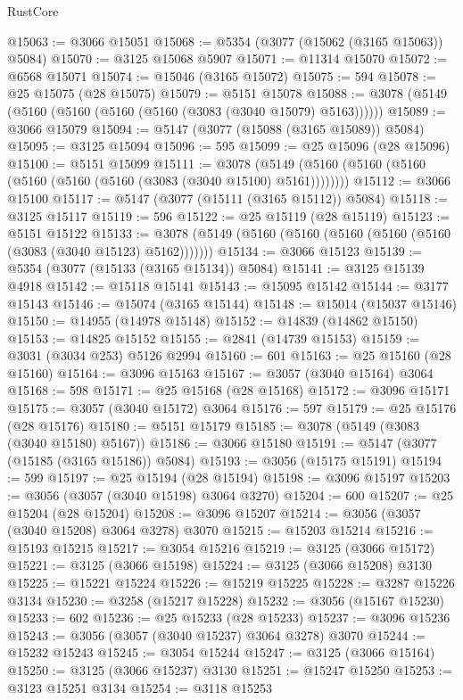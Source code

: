\begin{lexlean}{RustCore}
\begin{coremodule}
@15063 := @3066 @15051
@15068 := @5354 (@3077 (@15062 (@3165 @15063)) @5084)
@15070 := @3125 @15068 @5907
@15071 := @11314 @15070
@15072 := @6568 @15071
@15074 := @15046 (@3165 @15072)
@15075 := 594
@15078 := @25 @15075 (@28 @15075)
@15079 := @5151 @15078
@15088 := @3078 (@5149 (@5160 (@5160 (@5160 (@5160 (@3083 (@3040 @15079) @5163))))))
@15089 := @3066 @15079
@15094 := @5147 (@3077 (@15088 (@3165 @15089)) @5084)
@15095 := @3125 @15094
@15096 := 595
@15099 := @25 @15096 (@28 @15096)
@15100 := @5151 @15099
@15111 := @3078 (@5149 (@5160 (@5160 (@5160 (@5160 (@5160 (@5160 (@3083 (@3040 @15100) @5161))))))))
@15112 := @3066 @15100
@15117 := @5147 (@3077 (@15111 (@3165 @15112)) @5084)
@15118 := @3125 @15117
@15119 := 596
@15122 := @25 @15119 (@28 @15119)
@15123 := @5151 @15122
@15133 := @3078 (@5149 (@5160 (@5160 (@5160 (@5160 (@5160 (@3083 (@3040 @15123) @5162)))))))
@15134 := @3066 @15123
@15139 := @5354 (@3077 (@15133 (@3165 @15134)) @5084)
@15141 := @3125 @15139 @4918
@15142 := @15118 @15141
@15143 := @15095 @15142
@15144 := @3177 @15143
@15146 := @15074 (@3165 @15144)
@15148 := @15014 (@15037 @15146)
@15150 := @14955 (@14978 @15148)
@15152 := @14839 (@14862 @15150)
@15153 := @14825 @15152
@15155 := @2841 (@14739 @15153)
@15159 := @3031 (@3034 @253) @5126 @2994
@15160 := 601
@15163 := @25 @15160 (@28 @15160)
@15164 := @3096 @15163
@15167 := @3057 (@3040 @15164) @3064
@15168 := 598
@15171 := @25 @15168 (@28 @15168)
@15172 := @3096 @15171
@15175 := @3057 (@3040 @15172) @3064
@15176 := 597
@15179 := @25 @15176 (@28 @15176)
@15180 := @5151 @15179
@15185 := @3078 (@5149 (@3083 (@3040 @15180) @5167))
@15186 := @3066 @15180
@15191 := @5147 (@3077 (@15185 (@3165 @15186)) @5084)
@15193 := @3056 (@15175 @15191)
@15194 := 599
@15197 := @25 @15194 (@28 @15194)
@15198 := @3096 @15197
@15203 := @3056 (@3057 (@3040 @15198) @3064 @3270)
@15204 := 600
@15207 := @25 @15204 (@28 @15204)
@15208 := @3096 @15207
@15214 := @3056 (@3057 (@3040 @15208) @3064 @3278) @3070
@15215 := @15203 @15214
@15216 := @15193 @15215
@15217 := @3054 @15216
@15219 := @3125 (@3066 @15172)
@15221 := @3125 (@3066 @15198)
@15224 := @3125 (@3066 @15208) @3130
@15225 := @15221 @15224
@15226 := @15219 @15225
@15228 := @3287 @15226 @3134
@15230 := @3258 (@15217 @15228)
@15232 := @3056 (@15167 @15230)
@15233 := 602
@15236 := @25 @15233 (@28 @15233)
@15237 := @3096 @15236
@15243 := @3056 (@3057 (@3040 @15237) @3064 @3278) @3070
@15244 := @15232 @15243
@15245 := @3054 @15244
@15247 := @3125 (@3066 @15164)
@15250 := @3125 (@3066 @15237) @3130
@15251 := @15247 @15250
@15253 := @3123 @15251 @3134
@15254 := @3118 @15253

\end{coremodule}
\end{lexlean}
